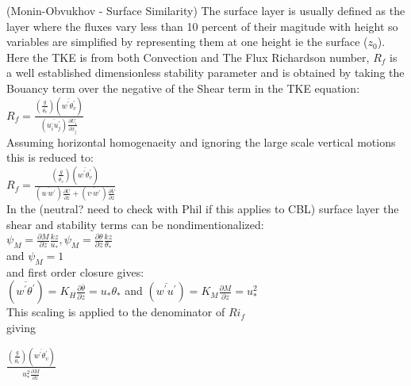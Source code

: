 (Monin-Obvukhov - Surface Similarity)
The surface layer is usually defined as the layer where the fluxes vary less than 10 percent of their 
magitude with height so variables are simplified by representing them at one height ie the surface ($z_{0}$).
Here the TKE is from both Convection and The Flux Richardson number, $R_{f}$ is a well established
dimensionless stability parameter and is obtained by taking the Bouancy term over the negative of the Shear 
term in the TKE equation:\\

$R_{f} = \frac{\left({\frac{g}{\overline{\theta_{v}}}} \right) \left(\overline{w^{'}\theta_{v}^{'}} \right)}{ \left(\overline{u_{i}^{,}u_{j}^{'}} \right) \frac{\partial \overline{U_{i}}}{\partial x_{j}}}$ \\

Assuming horizontal homogenaeity and ignoring the large scale vertical motions this is reduced to:\\

$R_{f} = \frac{\left({\frac{g}{\overline{\theta_{v}}}} \right) \left(\overline{w^{'}\theta_{v}^{'}} \right)}{ \left(\overline{u^{,}w^{'}} \right) 
\frac{\partial \overline{U}}{\partial z} + \left(\overline{v^{,}w^{'}} \right) \frac{\partial \overline{V}}{\partial z}}$ \\

In the (neutral? need to check with Phil if this applies to CBL) surface layer the shear and stability terms can be nondimentionalized:\\

$\psi_{M} = \frac{\partial M}{\partial z}\frac{kz}{u_{*}}, \psi_{M} = \frac{\partial \theta}{\partial z}\frac{kz}{\theta_{*}}$\\

and $\psi_{M} = 1$\\

and first order closure gives:\\

$\left( \overline{w^{'}\theta^{'}} \right) = K_{H} \frac{\partial \overline{\theta}}{\partial z} = u_{*} \theta_{*}$ 
and $\left( \overline{w^{'} u^{'}} \right) = K_{M} \frac{\partial M}{\partial z} = u_{*}^{2}$\\

This scaling is applied to the denominator of $Ri_{f}$\\ giving

$\frac{\left({\frac{g}{\overline{\theta_{v}}}} \right) \left(\overline{w^{'}\theta_{v}^{'}} \right)}{u_{*}^{2}  \frac{\partial \overline{M}}{\partial z}}$\\

